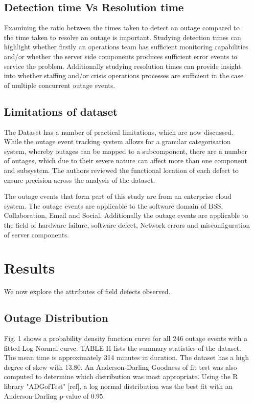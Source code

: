\documentclass[conference]{IEEEtran}
\begin{document}
\subsection{Detection time Vs Resolution time}

Examining the ratio between the times taken to detect an outage compared to the time taken to resolve an outage is important. Studying detection times can highlight whether firstly an operations team has sufficient monitoring capabilities and/or whether the server side components produces sufficient error events to service the problem. Additionally studying resolution times can provide insight into whether staffing and/or crisis operations processes are sufficient in the case of multiple concurrent outage events.

\subsection{Limitations of dataset}

The Dataset has a number of practical limitations, which are now discussed. While the outage event tracking system allows for a granular categorisation system, whereby outages can be mapped to a subcomponent, there are a number of outages, which due to their severe nature can affect more than one component and subsystem. The authors reviewed the functional location of each defect to ensure precision across the analysis of the dataset. \par
The outage events that form part of this study are from an enterprise cloud system. The outage events are applicable to the software domain of BSS, Collaboration, Email and Social. Additionally the outage events are applicable to the field of hardware failure, software defect, Network errors and misconfiguration of server components.

\section{Results}

We now explore the attributes of field defects observed.

\subsection{Outage Distribution}

Fig. 1 shows a probability density function curve for all 246 outage events with a fitted Log Normal curve. 
TABLE II lists the summary statistics of the dataset. The mean time is approximately 314 minutes in duration. The dataset has a high degree of skew with 13.80. An Anderson-Darling Goodness of fit test was also computed to determine which distribution was most appropriate. Using the R library "ADGofTest" [ref], a log normal distribution was the best fit with an Anderson-Darling  p-value of 0.95.
\end{document}
